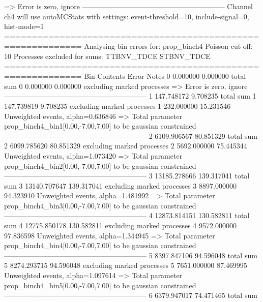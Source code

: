   => Error is zero, ignore      
------------------------------------------------------------
Channel ch4 will use autoMCStats with settings: event-threshold=10, include-signal=0, hist-mode=1
============================================================
Analysing bin errors for: prop_binch4
Poisson cut-off: 10
Processes excluded for sums: TTBNV_TDCE STBNV_TDCE
============================================================
Bin        Contents        Error           Notes                         
0          0.000000        0.000000        total sum                     
0          0.000000        0.000000        excluding marked processes    
  => Error is zero, ignore      
------------------------------------------------------------
1          147.748172      9.708235        total sum                     
1          147.739819      9.708235        excluding marked processes    
1          232.000000      15.231546       Unweighted events, alpha=0.636846
  => Total parameter prop_binch4_bin1[0.00,-7.00,7.00] to be gaussian constrained
------------------------------------------------------------
2          6109.906567     80.851329       total sum                     
2          6099.785620     80.851329       excluding marked processes    
2          5692.000000     75.445344       Unweighted events, alpha=1.073420
  => Total parameter prop_binch4_bin2[0.00,-7.00,7.00] to be gaussian constrained
------------------------------------------------------------
3          13185.278666    139.317041      total sum                     
3          13140.707647    139.317041      excluding marked processes    
3          8897.000000     94.323910       Unweighted events, alpha=1.481992
  => Total parameter prop_binch4_bin3[0.00,-7.00,7.00] to be gaussian constrained
------------------------------------------------------------
4          12873.814151    130.582811      total sum                     
4          12775.850178    130.582811      excluding marked processes    
4          9572.000000     97.836598       Unweighted events, alpha=1.344945
  => Total parameter prop_binch4_bin4[0.00,-7.00,7.00] to be gaussian constrained
------------------------------------------------------------
5          8397.847106     94.596048       total sum                     
5          8274.293715     94.596048       excluding marked processes    
5          7651.000000     87.469995       Unweighted events, alpha=1.097614
  => Total parameter prop_binch4_bin5[0.00,-7.00,7.00] to be gaussian constrained
------------------------------------------------------------
6          6379.947017     74.471465       total sum                     
